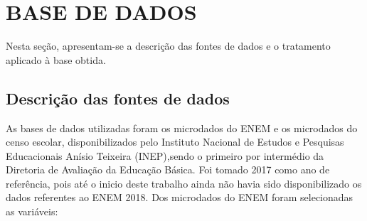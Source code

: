 \chapter[BASE DE DADOS]{BASE DE DADOS} %

Nesta seção, apresentam-se a descrição das fontes de dados e o tratamento aplicado à base obtida.

\section{Descrição das fontes de dados}

As bases de dados utilizadas foram os microdados do ENEM e os microdados do censo escolar, disponibilizados pelo Instituto Nacional de Estudos e Pesquisas Educacionais Anísio Teixeira (INEP),sendo o primeiro por intermédio da Diretoria de Avaliação da Educação Básica. Foi tomado 2017 como ano de referência, pois até o inicio deste trabalho ainda não havia sido disponibilizado os dados referentes ao ENEM 2018.
Dos microdados do ENEM foram selecionadas as variáveis:

